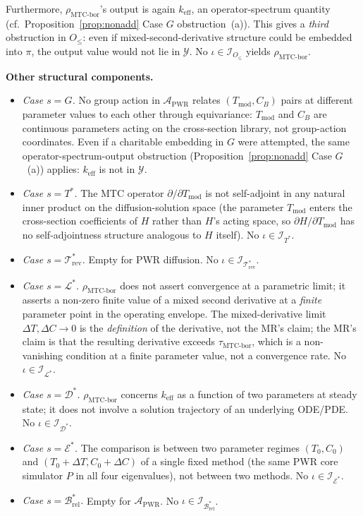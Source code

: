 \documentclass[acmsmall,screen,review]{acmart}
\begin{document}
Furthermore, $\rho_{\mathrm{MTC\text{-}bor}}$'s output is again $k_{\mathrm{eff}}$, an operator-spectrum quantity (cf.\ Proposition~\ref{prop:nonadd} Case $G$ obstruction~(a)). This gives a \emph{third} obstruction in $O_{\le}$: even if mixed-second-derivative structure could be embedded into $\pi$, the output value would not lie in $\mathcal{Y}$. No $\iota \in \mathcal{I}_{O_{\le}}$ yields $\rho_{\mathrm{MTC\text{-}bor}}$.

\textbf{Other structural components.}
\begin{itemize}[leftmargin=*,nosep]
  \item \emph{Case $s = G$.} No group action in $\mathcal{A}_{\mathrm{PWR}}$ relates $(T_{\mathrm{mod}}, C_{B})$ pairs at different parameter values to each other through equivariance: $T_{\mathrm{mod}}$ and $C_{B}$ are continuous parameters acting on the cross-section library, not group-action coordinates. Even if a charitable embedding in $G$ were attempted, the same operator-spectrum-output obstruction (Proposition~\ref{prop:nonadd} Case $G$~(a)) applies: $k_{\mathrm{eff}}$ is not in $\mathcal{Y}$.
  \item \emph{Case $s = T^{*}$.} The MTC operator $\partial/\partial T_{\mathrm{mod}}$ is not self-adjoint in any natural inner product on the diffusion-solution space (the parameter $T_{\mathrm{mod}}$ enters the cross-section coefficients of $H$ rather than $H$'s acting space, so $\partial H/\partial T_{\mathrm{mod}}$ has no self-adjointness structure analogous to $H$ itself). No $\iota \in \mathcal{I}_{T^{*}}$.
  \item \emph{Case $s = \mathcal{T}^{*}_{\mathrm{rev}}$.} Empty for PWR diffusion. No $\iota \in \mathcal{I}_{\mathcal{T}^{*}_{\mathrm{rev}}}$.
  \item \emph{Case $s = \mathcal{L}^{*}$.} $\rho_{\mathrm{MTC\text{-}bor}}$ does not assert convergence at a parametric limit; it asserts a non-zero finite value of a mixed second derivative at a \emph{finite} parameter point in the operating envelope. The mixed-derivative limit $\Delta T, \Delta C \to 0$ is the \emph{definition} of the derivative, not the MR's claim; the MR's claim is that the resulting derivative exceeds $\tau_{\mathrm{MTC\text{-}bor}}$, which is a non-vanishing condition at a finite parameter value, not a convergence rate. No $\iota \in \mathcal{I}_{\mathcal{L}^{*}}$.
  \item \emph{Case $s = \mathcal{D}^{*}$.} $\rho_{\mathrm{MTC\text{-}bor}}$ concerns $k_{\mathrm{eff}}$ as a function of two parameters at steady state; it does not involve a solution trajectory of an underlying ODE/PDE. No $\iota \in \mathcal{I}_{\mathcal{D}^{*}}$.
  \item \emph{Case $s = \mathcal{E}^{*}$.} The comparison is between two parameter regimes $(T_{0}, C_{0})$ and $(T_{0}+\Delta T, C_{0}+\Delta C)$ of a single fixed method (the same PWR core simulator $P$ in all four eigenvalues), not between two methods. No $\iota \in \mathcal{I}_{\mathcal{E}^{*}}$.
  \item \emph{Case $s = \mathcal{B}_{\mathrm{rel}}^{*}$.} Empty for $\mathcal{A}_{\mathrm{PWR}}$. No $\iota \in \mathcal{I}_{\mathcal{B}_{\mathrm{rel}}^{*}}$.
\end{itemize}
\end{document}
